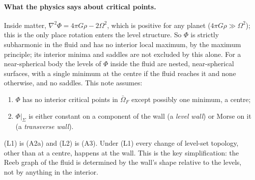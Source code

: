 \documentclass[11pt]{article}
\theoremstyle{definition}
\theoremstyle{remark}
\begin{document}
\paragraph{What the physics says about critical points.} Inside
matter, $\nabla^2\Phi = 4\pi G\rho - 2\Omega^2$, which is positive for
any planet ($4\pi G\rho \gg \Omega^2$); this is the only place rotation
enters the level structure. So $\Phi$ is strictly subharmonic in the
fluid and has no interior local maximum, by the maximum principle; its
interior minima and saddles are not excluded by this alone. For a
near-spherical body the levels of $\Phi$ inside the fluid are nested,
near-spherical surfaces, with a single minimum at the centre if the
fluid reaches it and none otherwise, and no saddles. This note
assumes:
\begin{enumerate}[label=(L\arabic*)]
\item $\Phi$ has no interior critical points in $\bar\Omega_F$ except
  possibly one minimum, a centre;
\item $\Phi|_\Sigma$ is either constant on a component of the wall (a
  \emph{level wall}) or Morse on it (a \emph{transverse wall}).
\end{enumerate}
(L1) is (A2a) and (L2) is (A3). Under (L1) every change of level-set
topology, other than at a centre, happens at the wall. This is the key
simplification: the Reeb graph of the fluid is determined by the
wall's shape relative to the levels, not by anything in the interior.
\end{document}
